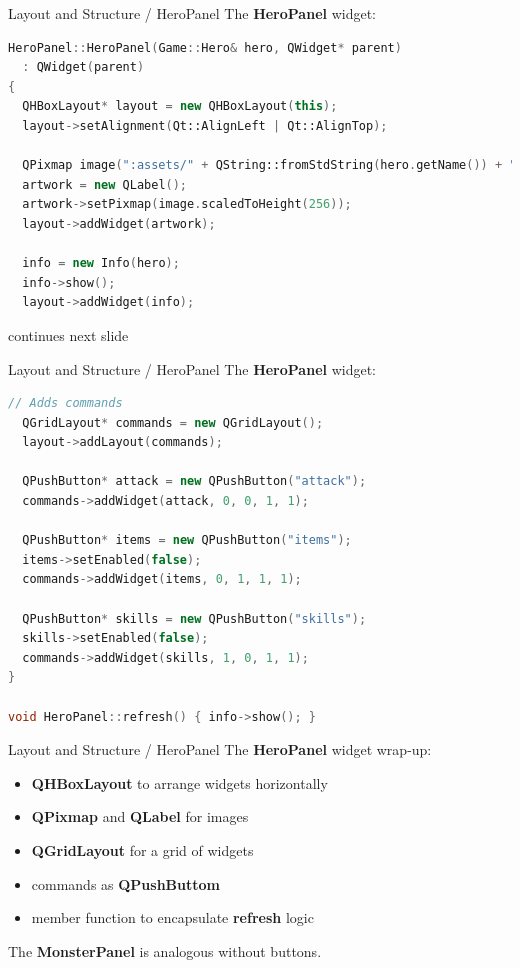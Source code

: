 \documentclass[11pt]{beamer}
\renewcommand{\emph}[1]{\textbf{#1}}
\begin{document}
\begin{frame}[fragile]{Layout and Structure / HeroPanel}
 The \emph{HeroPanel} widget:
 \begin{lstlisting}[language=C++]
HeroPanel::HeroPanel(Game::Hero& hero, QWidget* parent)
  : QWidget(parent)
{
  QHBoxLayout* layout = new QHBoxLayout(this);
  layout->setAlignment(Qt::AlignLeft | Qt::AlignTop);

  QPixmap image(":assets/" + QString::fromStdString(hero.getName()) + ".png");
  artwork = new QLabel();
  artwork->setPixmap(image.scaledToHeight(256));
  layout->addWidget(artwork);

  info = new Info(hero);
  info->show();
  layout->addWidget(info);
\end{lstlisting}
{\footnotesize continues next slide}
\end{frame}

\begin{frame}[fragile]{Layout and Structure / HeroPanel}
 The \emph{HeroPanel} widget:
 \begin{lstlisting}[language=C++]
  // Adds commands
  QGridLayout* commands = new QGridLayout();
  layout->addLayout(commands);

  QPushButton* attack = new QPushButton("attack");
  commands->addWidget(attack, 0, 0, 1, 1);

  QPushButton* items = new QPushButton("items");
  items->setEnabled(false);
  commands->addWidget(items, 0, 1, 1, 1);

  QPushButton* skills = new QPushButton("skills");
  skills->setEnabled(false);
  commands->addWidget(skills, 1, 0, 1, 1);
}

void HeroPanel::refresh() { info->show(); }
\end{lstlisting}
\end{frame}

\begin{frame}[fragile]{Layout and Structure / HeroPanel}
 The \emph{HeroPanel} widget wrap-up:
 \begin{itemize}
  \item \emph{QHBoxLayout} to arrange widgets horizontally
  \item \emph{QPixmap} and \emph{QLabel} for images
  \item \emph{QGridLayout} for a grid of widgets
  \item commands as \emph{QPushButtom}
  \item member function to encapsulate \emph{refresh} logic
 \end{itemize}
 
 The \emph{MonsterPanel} is analogous without buttons.
\end{frame}
\end{document}
